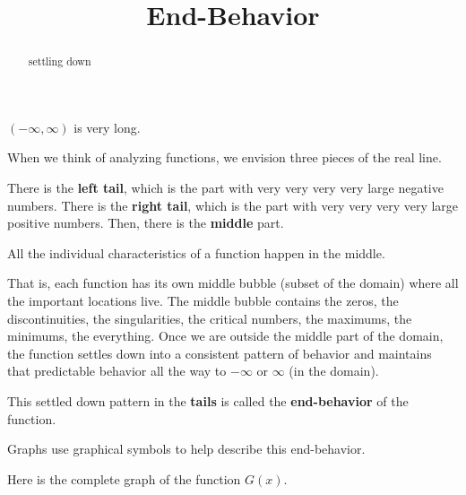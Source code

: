 \documentclass{ximera}
\title{End-Behavior}
\begin{document}
\begin{abstract}
settling down
\end{abstract}
\maketitle


$(-\infty, \infty)$ is very long. 


When we think of analyzing functions, we envision three pieces of the real line. 





There is the \textbf{\textcolor{red!70!black}{left tail}}, which is the part with very very very very large negative numbers. There is the \textbf{\textcolor{red!70!black}{right tail}}, which is the part with very very very very large positive numbers. Then, there is the \textbf{\textcolor{purple!85!blue}{middle}} part. 

All the individual characteristics of a function happen in the middle. 

That is, each function has its own middle bubble (subset of the domain) where all the important locations live.  The middle bubble contains the zeros, the discontinuities, the singularities, the critical numbers, the maximums, the minimums, the everything.  Once we are outside the middle part of the domain, the function settles down into a consistent pattern of behavior and maintains that predictable behavior all the way to $-\infty$ or $\infty$ (in the domain). 

This settled down pattern in the \textbf{\textcolor{red!70!black}{tails}} is called the \textbf{\textcolor{red!70!black}{end-behavior}} of the function. 


Graphs use graphical symbols to help describe this end-behavior.


Here is the complete graph of the function $G(x)$. 
\end{document}
